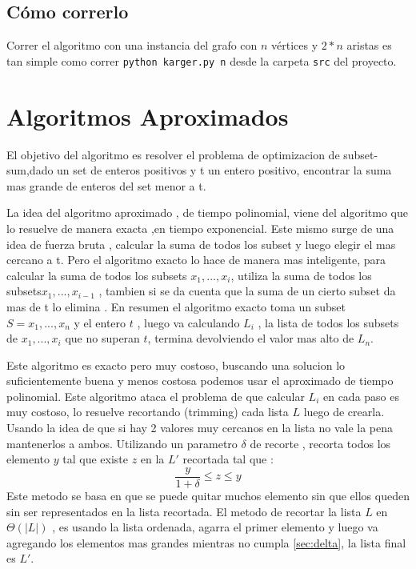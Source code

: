 \documentclass[a4paper,10pt]{article}
\begin{document}
\subsection{Cómo correrlo}
Correr el algoritmo con una instancia del grafo con $n$ vértices y $2*n$ aristas es tan simple como correr \texttt{python karger.py n} desde la carpeta \texttt{src} del proyecto.

\section{Algoritmos Aproximados}
El objetivo del algoritmo es resolver el problema de optimizacion de subset-sum,dado un set de enteros positivos y t un entero positivo, encontrar la suma mas grande de enteros del set menor a t. 

La idea del algoritmo aproximado , de tiempo polinomial, viene del algoritmo que lo resuelve de manera exacta ,en tiempo exponencial. Este mismo surge de una idea de fuerza bruta , calcular la suma de todos los subset y luego elegir el mas cercano a t. Pero el algoritmo exacto lo hace de manera mas inteligente, para calcular la suma de todos los subsets ${x_1,...,x_i}$, utiliza la suma de todos los subsets${x_1,...,x_{i-1}}$ , tambien si se da cuenta que la suma de un cierto subset da mas de t lo elimina . En resumen el algoritmo exacto toma un subset $S={x_1,...,x_n}$ y el entero $t$ , luego va calculando $L_i$ , la lista de todos los subsets de ${x_1,...,x_i}$ que no superan $t$, termina devolviendo el valor mas alto de $L_n$.

Este algoritmo es exacto pero muy costoso, buscando una solucion lo suficientemente buena y menos costosa podemos usar el aproximado de tiempo polinomial. Este algoritmo ataca el problema de que calcular $L_i$ en cada paso es muy costoso, lo resuelve recortando (trimming) cada lista $L$ luego de crearla. Usando la idea de que si hay 2 valores muy cercanos en la lista no vale la pena mantenerlos a ambos. Utilizando un parametro $\delta$ de recorte , recorta todos los elemento $y$ tal que existe $z$ en la $L'$ recortada tal que : \begin{equation}
	\label{sec:delta}
 \dfrac{y} {1+\delta} \leq z \leq y \tag{3.1}
\end{equation}
Este metodo se basa en que se puede quitar muchos elemento sin que ellos queden sin ser representados en la lista recortada. El metodo de recortar la lista $L$ en $\Theta(|L|)$ , es usando la lista ordenada, agarra el primer elemento y luego va agregando los elementos mas grandes mientras no cumpla \ref{sec:delta}, la lista final es $L'$.
\end{document}
